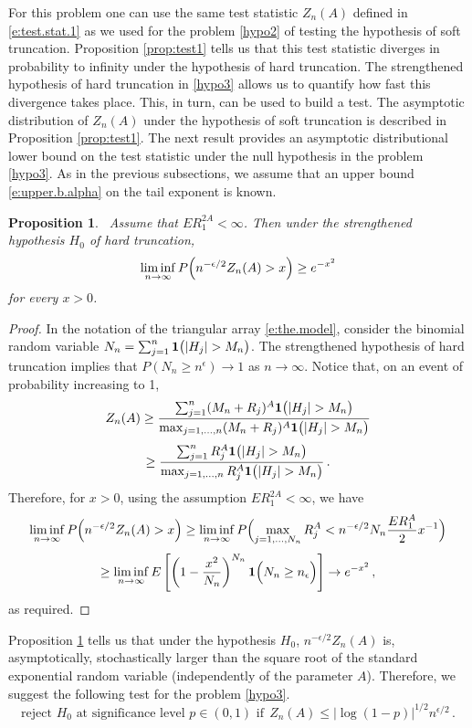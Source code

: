 \documentclass[11pt]{amsart}
\newtheorem{prop}{Proposition}[section]
\numberwithin{equation}{section}
\begin{document}
For this problem one can use the same test statistic $Z_n(A)$ defined
in \eqref{e:test.stat.1} as we used for the problem \eqref{hypo2} of
testing the hypothesis of soft truncation. Proposition
\ref{prop:test1} tells us that this test statistic diverges in
probability to infinity under the hypothesis of hard truncation.
The strengthened hypothesis of hard truncation in \eqref{hypo3} allows
us to quantify how fast this divergence takes place. This, in turn,
can be used to build a test. The asymptotic distribution of $Z_n(A)$
under the hypothesis of soft truncation is described in Proposition
\ref{prop:test1}. The next result provides an asymptotic
distributional lower bound on the test statistic under the null
hypothesis in the problem \eqref{hypo3}. As in the previous
subsections, we assume that an upper bound \eqref{e:upper.b.alpha} on the
tail exponent is known.

\begin{prop}\label{prop:test3} \ Assume that $ER_1^{2A}<\infty$. Then
  under the strengthened hypothesis $H_0$  of hard truncation,
\begin{equation} \label{e:test3.h0}
\liminf_{n\to\infty} P\Bigl( n^{-\epsilon/2}Z_n(A)> x\Bigr) \geq
e^{-x^{2}}
\end{equation}
for every $x>0$.
\end{prop}
\begin{proof}
In the notation of the triangular array \eqref{e:the.model}, consider
the binomial random variable
$N_n = \sum_{j=1}^n {{\bf 1}}\bigl(|H_j|>M_n\bigr)$. The strengthened
hypothesis of hard truncation implies that $P(N_n\geq n^{\epsilon})\to
1$ as $n\to\infty$. Notice that, on an event of probability increasing
to 1,
$$
Z_n(A) \geq \frac{ \sum_{j=1}^n
(M_n+R_j)^A{{\bf 1}}\bigl(|H_j|>M_n\bigr)}{\max_{j=1,\ldots,n}
(M_n+R_j)^A{{\bf 1}}\bigl(|H_j|>M_n\bigr)}
$$
$$
\geq \frac{ \sum_{j=1}^n
R_j^A{{\bf 1}}\bigl(|H_j|>M_n\bigr)}{\max_{j=1,\ldots,n}
R_j^A{{\bf 1}}\bigl(|H_j|>M_n\bigr)}\,.
$$
Therefore, for $x>0$, using the assumption $ER_1^{2A}<\infty$, we have
$$
\liminf_{n\to\infty} P\Bigl( n^{-\epsilon/2}Z_n(A)> x\Bigr) \geq
\liminf_{n\to\infty}P\Bigl(\max_{j=1,\ldots,
N_n}R_j^A < n^{-\epsilon/2}N_n\frac{ER_1^A}{2}x^{-1}\Bigr)
$$
$$
\geq \liminf_{n\to\infty} E\left[ \left(
1-\frac{x^2}{N_n}\right)^{N_n}{{\bf 1}}\Bigl( N_n\geq
n_\epsilon\Bigr) \right]
\to e^{-x^2}\,,
$$
as required.
\end{proof}

Proposition \ref{prop:test3} tells us that under the hypothesis $H_0$,
$n^{-\epsilon/2}Z_n(A)$ is, asymptotically, stochastically larger than
the square root of the standard exponential random variable
(independently of the parameter $A$). Therefore, we suggest the
following test for the problem \eqref{hypo3}.
\begin{equation} \label{e:test.h3.formal}
\text{reject $H_0$ at significance level $p\in (0,1)$ if} \ \
Z_n(A) \leq \bigl| \log(1-p)\bigr|^{1/2}n^{\epsilon/2}\,.
\end{equation}
\end{document}
